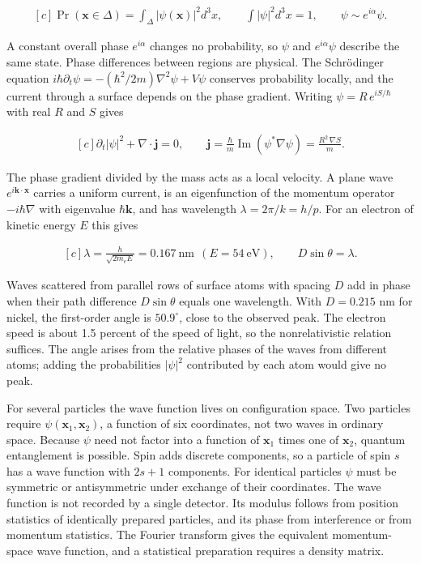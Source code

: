 \documentclass[11pt,oneside]{book}
\newenvironment{centeredalign}{\[\begin{gathered}[c]}{\end{gathered}\]}
\begin{document}
\begin{centeredalign}
\Pr(\mathbf x\in\Delta)=\int_\Delta|\psi(\mathbf x)|^2d^3x,\qquad
\int|\psi|^2d^3x=1,\qquad \psi\sim e^{i\alpha}\psi.
\end{centeredalign}

A constant overall phase \(e^{i\alpha}\) changes no probability, so \(\psi\) and \(e^{i\alpha}\psi\) describe the same state. Phase differences between regions are physical. The Schrödinger equation \(i\hbar\partial_t\psi=-(\hbar^2/2m)\nabla^2\psi+V\psi\) conserves probability locally, and the current through a surface depends on the phase gradient. Writing \(\psi=R\,e^{iS/\hbar}\) with real \(R\) and \(S\) gives

\begin{centeredalign}
\partial_t|\psi|^2+\nabla\cdot\mathbf j=0,\qquad
\mathbf j=\frac{\hbar}{m}\operatorname{Im}(\psi^*\nabla\psi)=\frac{R^2\,\nabla S}{m}.
\end{centeredalign}

The phase gradient divided by the mass acts as a local velocity. A plane wave \(e^{i\mathbf k\cdot\mathbf x}\) carries a uniform current, is an eigenfunction of the momentum operator \(-i\hbar\nabla\) with eigenvalue \(\hbar\mathbf k\), and has wavelength \(\lambda=2\pi/k=h/p\). For an electron of kinetic energy \(E\) this gives

\begin{centeredalign}
\lambda=\frac{h}{\sqrt{2m_eE}}=0.167\ \mathrm{nm}\ \ (E=54\ \mathrm{eV}),\qquad
D\sin\theta=\lambda.
\end{centeredalign}

Waves scattered from parallel rows of surface atoms with spacing \(D\) add in phase when their path difference \(D\sin\theta\) equals one wavelength. With \(D=0.215\) nm for nickel, the first-order angle is \(50.9^\circ\), close to the observed peak. The electron speed is about 1.5 percent of the speed of light, so the nonrelativistic relation suffices. The angle arises from the relative phases of the waves from different atoms; adding the probabilities \(|\psi|^2\) contributed by each atom would give no peak.

For several particles the wave function lives on configuration space. Two particles require \(\psi(\mathbf x_1,\mathbf x_2)\), a function of six coordinates, not two waves in ordinary space. Because \(\psi\) need not factor into a function of \(\mathbf x_1\) times one of \(\mathbf x_2\), quantum entanglement is possible. Spin adds discrete components, so a particle of spin \(s\) has a wave function with \(2s+1\) components. For identical particles \(\psi\) must be symmetric or antisymmetric under exchange of their coordinates. The wave function is not recorded by a single detector. Its modulus follows from position statistics of identically prepared particles, and its phase from interference or from momentum statistics. The Fourier transform gives the equivalent momentum-space wave function, and a statistical preparation requires a density matrix.
\end{document}
